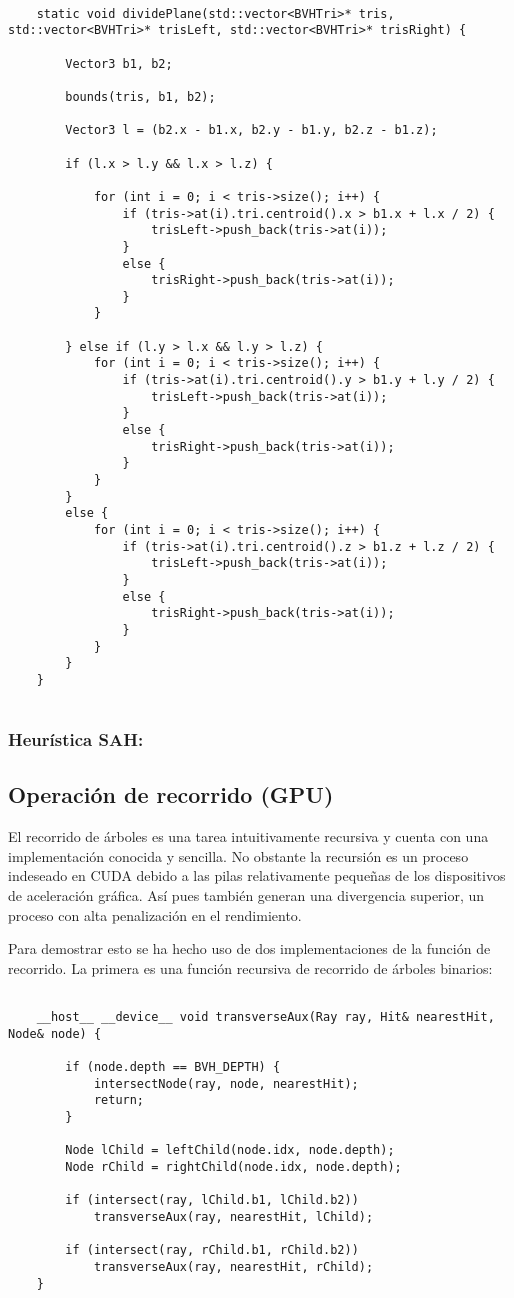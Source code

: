 \begin{lstlisting}
	
	static void dividePlane(std::vector<BVHTri>* tris, std::vector<BVHTri>* trisLeft, std::vector<BVHTri>* trisRight) {

		Vector3 b1, b2;

		bounds(tris, b1, b2);

		Vector3 l = (b2.x - b1.x, b2.y - b1.y, b2.z - b1.z);

		if (l.x > l.y && l.x > l.z) {

			for (int i = 0; i < tris->size(); i++) {
				if (tris->at(i).tri.centroid().x > b1.x + l.x / 2) {
					trisLeft->push_back(tris->at(i));
				}
				else {
					trisRight->push_back(tris->at(i));
				}
			}

		} else if (l.y > l.x && l.y > l.z) {
			for (int i = 0; i < tris->size(); i++) {
				if (tris->at(i).tri.centroid().y > b1.y + l.y / 2) {
					trisLeft->push_back(tris->at(i));
				}
				else {
					trisRight->push_back(tris->at(i));
				}
			}
		}
		else {
			for (int i = 0; i < tris->size(); i++) {
				if (tris->at(i).tri.centroid().z > b1.z + l.z / 2) {
					trisLeft->push_back(tris->at(i));
				}
				else {
					trisRight->push_back(tris->at(i));
				}
			}
		}
	}
	
\end{lstlisting}

\subsubsection{Heurística SAH:}
	

\subsection{Operación de recorrido (GPU)}
	
El recorrido de árboles es una tarea intuitivamente recursiva y cuenta con una implementación conocida y sencilla. No obstante la recursión es un proceso indeseado en CUDA debido a las pilas relativamente pequeñas de los dispositivos de aceleración gráfica. Así pues también generan una divergencia superior, un proceso con alta penalización en el rendimiento.

Para demostrar esto se ha hecho uso de dos implementaciones de la función de recorrido. La primera es una función recursiva de recorrido de árboles binarios:

\begin{lstlisting}
	
	__host__ __device__ void transverseAux(Ray ray, Hit& nearestHit, Node& node) {
	
		if (node.depth == BVH_DEPTH) {
			intersectNode(ray, node, nearestHit);
			return;
		}
	
		Node lChild = leftChild(node.idx, node.depth);
		Node rChild = rightChild(node.idx, node.depth);
	
		if (intersect(ray, lChild.b1, lChild.b2))
			transverseAux(ray, nearestHit, lChild);
		
		if (intersect(ray, rChild.b1, rChild.b2))
			transverseAux(ray, nearestHit, rChild);		
	}

\end{lstlisting}

